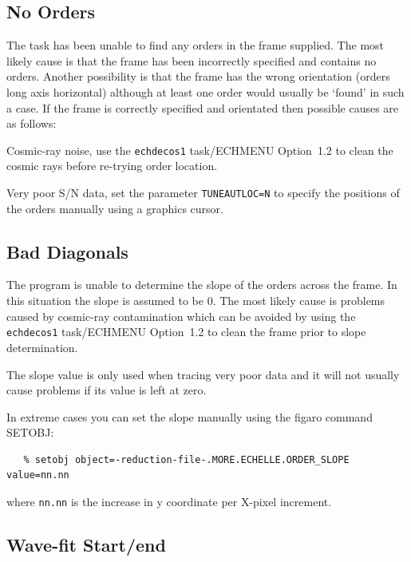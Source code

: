 \documentclass[twoside,11pt]{article}
\newcommand{\htmlref}[2]{#1}
\newcommand{\xref}[3]{#1}
\newcommand{\xlabel}[1]{}
\renewcommand{\_}{\texttt{\symbol{95}}}
\newcommand{\mlabel}[1]{\xlabel{#1}\label{#1}}
\newcommand{\myindex}[1]{\index{#1}}
\newcommand{\myindex}[1]{}
\begin{document}
\subsection{\mlabel{no_orders} No Orders}
\myindex{Locating orders!failure}

The task has been unable to find any orders in the frame supplied. The
most likely cause is that the frame has been incorrectly specified and
contains no orders. Another possibility is that the frame has the wrong
orientation (orders long axis horizontal) although at least one order
would usually be `found' in such a case. If the frame is correctly
specified and orientated then possible causes are as follows:

Cosmic-ray noise, use the \htmlref{{\tt ech\_decos1} task/ECHMENU Option~1.2}
{ech_decos1} to
clean the cosmic rays before re-trying order location.

Very poor S/N data, set the parameter
\htmlref{{\tt{TUNE\_AUTLOC=N}}}{par_TUNE_AUTLOC} to specify the
positions of the orders manually using a graphics cursor.

\subsection{\mlabel{bad_diagonals} Bad Diagonals}

The program is unable to determine the slope of the orders across the
frame. In this situation the slope is assumed to be 0. The most likely
cause is problems caused by cosmic-ray contamination which can be
avoided by using the \texttt{ech\_decos1} task/ECHMENU Option~1.2 to clean the
frame prior to slope determination.

The slope value is only used when tracing very poor data and it will not
usually cause problems if its value is left at zero.

In extreme cases you can set the slope manually using the
\xref{{\sc figaro}}{sun86}{} command \xref{SETOBJ}{sun86}{SETOBJ}:

\begin{verbatim}
   % setobj object=-reduction-file-.MORE.ECHELLE.ORDER_SLOPE value=nn.nn
\end{verbatim}

where {\tt nn.nn} is the increase in y coordinate per X-pixel increment.

\subsection{\mlabel{wave_fit_start_end} Wave-fit Start/end}
\end{document}
